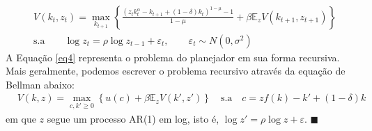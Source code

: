 \documentclass[10pt]{article}
\newcommand*{\QEDA}{\hfill\ensuremath{\blacksquare}}%
\newcommand\E{\mathbb{E}}
\newcommand\0{\mathbf{0}}
\newcounter{exercise}
\newcounter{problem}[exercise]
\newenvironment{sol}
    {\\[1em] {\color{magenta}\text{Resposta.}}
    }
    {{\color{blue!50!black}\QEDA}}
\begin{document}
\begin{enumerate}[wide]
\begin{sol}
\begin{equation}
\begin{aligned}
&V(k_t, z_t) = \max_{k_{t+1}} \left\{ \frac{\left(z_t k_t^\alpha - k_{t+1} + (1-\delta)k_t\right)^{1-\mu} - 1}{1 - \mu}  + \beta \E_{z} V({k_{t+1}, z_{t+1}})\right\} \\[1em]
&\text{s.a} \qquad \log z_t = \rho \log z_{t-1} + \varepsilon_t, \qquad \varepsilon_t \sim N(0, \sigma^2)
\end{aligned} \label{eq4}
\end{equation}
A Equação \eqref{eq4} representa o problema do planejador em sua forma recursiva. Mais geralmente, podemos escrever o problema recursivo através da equação de Bellman abaixo: 
\begin{align*}
&V(k, z) = \max_{c, k' \geq 0} \left\{  u(c) + \beta \E_zV(k', z') \right\} \quad \text{s.a} \quad  c = zf(k) - k' + (1-\delta) k 
\end{align*}
em que $z$ segue um processo AR(1) em log, isto é, $\log z' = \rho \log z + \varepsilon$.
\end{sol}

\newpage


\end{enumerate}
\end{document}
